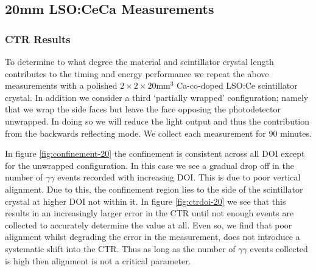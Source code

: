 \subsection{20mm LSO:CeCa Measurements}
\label{sec:20mm}
\subsubsection{CTR Results}
To determine to what degree the material and scintillator crystal length contributes to the timing and energy performance we repeat the above measurements with a polished $2\times2\times20$mm$^3$ Ca-co-doped LSO:Ce scintillator crystal. In addition we consider a third `partially wrapped' configuration; namely that we wrap the side faces but leave the face opposing the photodetector unwrapped. In doing so we will reduce the light output and thus the contribution from the backwards reflecting mode. We collect each measurement for 90 minutes.

In figure \ref{fig:confinement-20} the confinement is consistent across all DOI except for the unwrapped configuration. In this case we see a gradual drop off in the number of $\gamma\gamma$ events recorded with increasing DOI. This is due to poor vertical alignment. Due to this, the confinement region lies to the side of the scintillator crystal at higher DOI not within it. In figure \ref{fig:ctrdoi-20} we see that this results in an increasingly larger error in the CTR until not enough events are collected to accurately determine the value at all. Even so, we find that poor alignment whilst degrading the error in the measurement, does not introduce a systematic shift into the CTR. Thus as long as the number of $\gamma\gamma$ events collected is high then alignment is not a critical parameter. 
